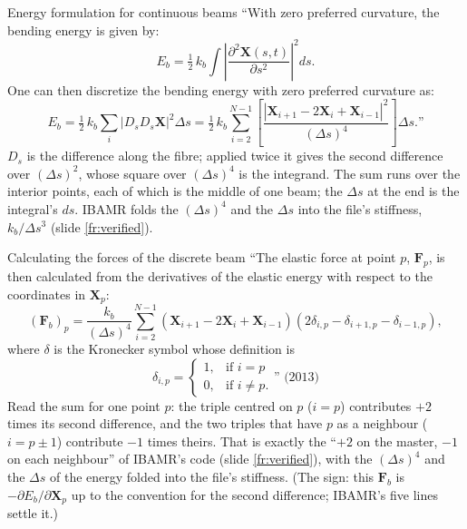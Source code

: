 \documentclass[aspectratio=169,11pt]{beamer}
\begin{document}
\begin{frame}{Energy formulation for continuous beams}
\label{fr:continuous}
\small ``With zero preferred curvature, the bending energy is given by:
\[
  E_b = \tfrac12\,k_b \int \left|\frac{\partial^2 \mathbf{X}(s,t)}{\partial s^2}\right|^2 ds .
\]
One can then discretize the bending energy with zero preferred curvature as:
\[
  E_b = \tfrac12\,k_b \sum_i \left|D_s D_s \mathbf{X}\right|^2 \Delta s
      = \tfrac12\,k_b \sum_{i=2}^{N-1} \left[\frac{\left|\mathbf{X}_{i+1} - 2\mathbf{X}_i + \mathbf{X}_{i-1}\right|^2}{(\Delta s)^4}\right] \Delta s .\text{''}
\]
\vspace{1mm}
\footnotesize $D_s$ is the difference along the fibre; applied twice it gives the second difference over $(\Delta s)^2$, whose square over $(\Delta s)^4$ is the integrand. The sum runs over the interior points, each of which is the middle of one beam; the $\Delta s$ at the end is the integral's $ds$. IBAMR folds the $(\Delta s)^4$ and the $\Delta s$ into the file's stiffness, $k_b/\Delta s^3$ (slide \ref{fr:verified}).
\end{frame}

\begin{frame}{Calculating the forces of the discrete beam}
\label{fr:discreteforce}
\small ``The elastic force at point $p$, $\mathbf{F}_p$, is then calculated from the derivatives of the elastic energy with respect to the coordinates in $\mathbf{X}_p$:
\[
  (\mathbf{F}_b)_p = \frac{k_b}{(\Delta s)^4} \sum_{i=2}^{N-1} \left(\mathbf{X}_{i+1} - 2\mathbf{X}_i + \mathbf{X}_{i-1}\right)\left(2\delta_{i,p} - \delta_{i+1,p} - \delta_{i-1,p}\right),
\]
where $\delta$ is the Kronecker symbol whose definition is
\[
  \delta_{i,p} = \begin{cases} 1, & \text{if } i = p\\ 0, & \text{if } i \neq p. \end{cases}\text{'' (2013)}
\]
\vspace{1mm}
\footnotesize Read the sum for one point $p$: the triple centred on $p$ ($i = p$) contributes $+2$ times its second difference, and the two triples that have $p$ as a neighbour ($i = p \pm 1$) contribute $-1$ times theirs. That is exactly the ``$+2$ on the master, $-1$ on each neighbour'' of IBAMR's code (slide \ref{fr:verified}), with the $(\Delta s)^4$ and the $\Delta s$ of the energy folded into the file's stiffness. (The sign: this $\mathbf{F}_b$ is $-\partial E_b/\partial\mathbf{X}_p$ up to the convention for the second difference; IBAMR's five lines settle it.)
\end{frame}
\end{document}
